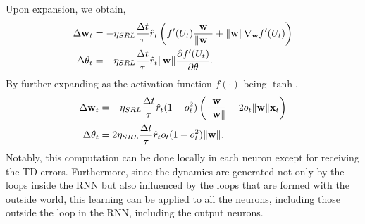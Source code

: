 Upon expansion, we obtain,
\begin{align}
\Delta {\bf w}_t &= -\eta_{SRL}\frac{\Delta t}{\tau} \hat{r}_t \left( f'(U_t)\frac{\bf w}{\| {\bf w} \|} + \| {\bf w} \| \nabla_{\bf w} f'(U_t) \right)\\
\Delta \theta_t &= -\eta_{SRL}\frac{\Delta t}{\tau} \hat{r}_t \| {\bf w} \| \frac{\partial f'(U_t)}{\partial \theta}.
\end{align}
By further expanding as the activation function $f(\cdot)$ being $\tanh$,
\begin{align}
\Delta {\bf w}_t &= - \eta_{SRL}\frac{\Delta t}{\tau} \hat{r}_t (1-o_t^2) \left( \frac{\bf w}{\| {\bf w}\|} - 2o_t\|{\bf w}\|{\bf x}_t \right)
\label{Eq:SRL}\\
\Delta \theta_t &= 2\eta_{SRL}\frac{\Delta t}{\tau} \hat{r}_t o_t (1-o_t^2) \|{\bf w}\|.
\label{Eq:SRL_Bias}
\end{align}
Notably, this computation can be done locally in each neuron except for receiving the TD errors.
Furthermore, since the dynamics are generated not only by the loops inside the RNN
but also influenced by the loops that are formed with the outside world,
this learning can be applied to all the neurons, including those outside the loop in the RNN, including the output neurons.

